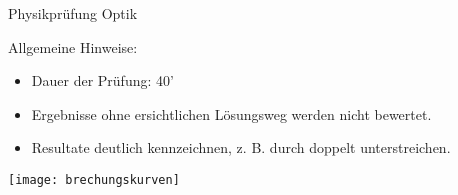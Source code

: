 \thispagestyle{empty}
\begin{Large}
Physikprüfung Optik\\
\end{Large}

Allgemeine Hinweise:
\begin{itemize}
	\item Dauer der Pr\"ufung: 40'
	\item Ergebnisse ohne ersichtlichen Lösungsweg werden nicht bewertet.
	\item Resultate deutlich kennzeichnen, z. B. durch doppelt unterstreichen.
\end{itemize}

\begin{center}
\texttt{[image: brechungskurven]}
\end{center}

\newpage
